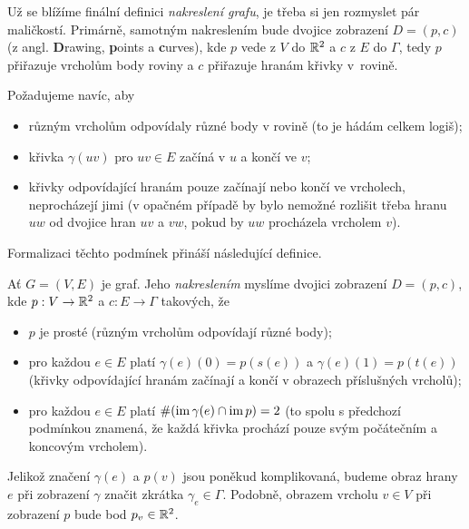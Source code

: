 Už se blížíme finální definici \emph{nakreslení grafu}, je třeba si jen
rozmyslet pár maličkostí. Primárně, samotným nakreslením bude dvojice zobrazení
$D = (p,c)$ (z angl. \textbf{D}rawing, \textbf{p}oints a \textbf{c}urves), kde
$p$ vede z $V$ do $\mathbb{R}^2$ a $c$ z $E$ do $\Gamma$, tedy $p$ přiřazuje vrcholům
body roviny a $c$ přiřazuje hranám křivky v~rovině.

Požadujeme navíc, aby
\begin{itemize}
 \item různým vrcholům odpovídaly různé body v rovině (to je hádám celkem
  logiš);
 \item křivka $\gamma(uv)$ pro $uv \in E$ začíná v $u$ a končí ve $v$; 
 \item křivky odpovídající hranám pouze začínají nebo končí ve vrcholech,
  neprocházejí jimi (v opačném případě by bylo nemožné rozlišit třeba hranu $uw$
  od dvojice hran $uv$ a $vw$, pokud by $uw$ procházela vrcholem $v$).
\end{itemize}

Formalizaci těchto podmínek přináší následující definice.
\begin{definition}
 \label{def:nakresleni-grafu}
 Ať $G = (V,E)$ je graf. Jeho \emph{nakreslením} myslíme dvojici zobrazení
 $D = (p,c)$, kde $p: V \to \mathbb{R}^2$ a $c: E \to \Gamma$ takových, že
 \begin{itemize}
  \item $p$ je prosté (různým vrcholům odpovídají různé body);
  \item pro každou $e \in E$ platí $\gamma(e)(0) = p(s(e))$ a $\gamma(e)(1) =
   p(t(e))$ (křivky odpovídající hranám začínají a končí v obrazech příslušných
   vrcholů);
  \item pro každou $e \in E$ platí $\# (\operatorname{im} \gamma(e) \cap \operatorname{im} p) = 2$ (to
   spolu s předchozí podmínkou znamená, že každá křivka prochází pouze svým
   počátečním a koncovým vrcholem).
 \end{itemize}
 Jelikož značení $\gamma(e)$ a $p(v)$ jsou poněkud komplikovaná, budeme obraz
 hrany $e$ při zobrazení $\gamma$ značit zkrátka $\gamma_e \in \Gamma$. Podobně,
 obrazem vrcholu $v \in V$ při zobrazení $p$ bude bod $p_v \in \mathbb{R}^2$.
\end{definition}




